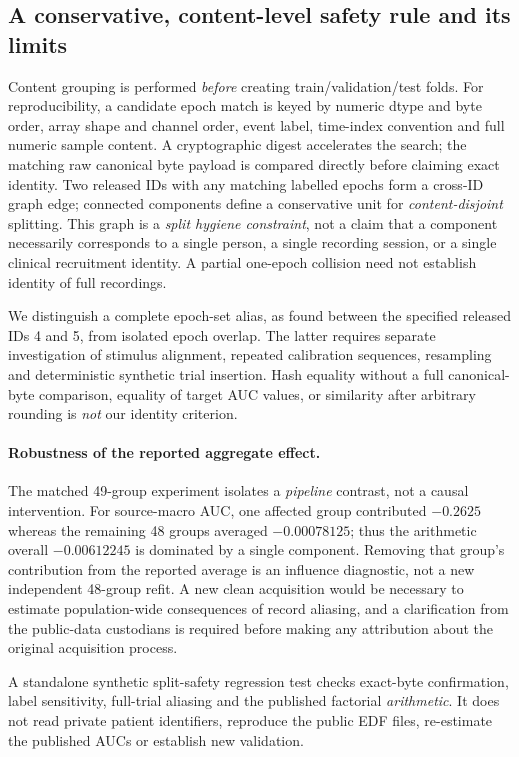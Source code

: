\subsection{A conservative, content-level safety rule and its limits}
\label{sec:p2-safe-grouping-rule}
Content grouping is performed \emph{before} creating
train/validation/test folds. For reproducibility, a candidate
epoch match is keyed by numeric dtype and byte order, array
shape and channel order, event label, time-index convention
and full numeric sample content. A cryptographic digest
accelerates the search; the matching raw canonical byte
payload is compared directly before claiming exact identity.
Two released IDs with any matching labelled epochs form
a cross-ID graph edge; connected components define a
conservative unit for \emph{content-disjoint} splitting.
This graph is a \emph{split hygiene constraint}, not a
claim that a component necessarily corresponds to a
single person, a single recording session, or a
single clinical recruitment identity. A partial
one-epoch collision need not establish identity
of full recordings.

We distinguish a complete epoch-set alias, as found
between the specified released IDs 4 and 5, from
isolated epoch overlap. The latter requires separate
investigation of stimulus alignment, repeated
calibration sequences, resampling and deterministic
synthetic trial insertion. Hash equality without
a full canonical-byte comparison, equality of
target AUC values, or similarity after arbitrary
rounding is \emph{not} our identity criterion.

\paragraph{Robustness of the reported aggregate effect.}
The matched 49-group experiment isolates a
\emph{pipeline} contrast, not a causal intervention.
For source-macro AUC, one affected group contributed
$-0.2625$ whereas the remaining 48 groups averaged
$-0.00078125$; thus the arithmetic overall
$-0.00612245$ is dominated by a single component.
Removing that group's contribution from the
reported average is an influence diagnostic,
not a new independent 48-group refit.
A new clean acquisition would be necessary to
estimate population-wide consequences of
record aliasing, and a clarification from
the public-data custodians is required
before making any attribution about the
original acquisition process.

A standalone synthetic split-safety regression
test checks exact-byte confirmation, label
sensitivity, full-trial aliasing and the
published factorial \emph{arithmetic}.
It does not read private patient identifiers,
reproduce the public EDF files, re-estimate
the published AUCs or establish new validation.
